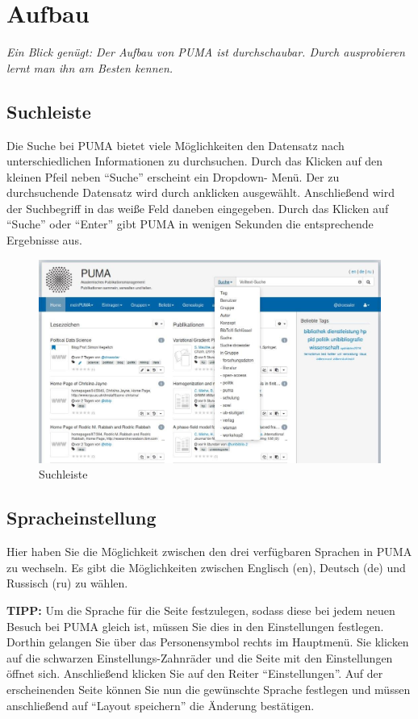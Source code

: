 \section{Aufbau}
\textit{Ein Blick genügt: Der Aufbau von PUMA ist durchschaubar. Durch ausprobieren lernt man ihn am Besten kennen.}
\subsection{Suchleiste}
Die Suche bei PUMA bietet viele Möglichkeiten den Datensatz nach unterschiedlichen Informationen zu durchsuchen. Durch das Klicken auf den kleinen Pfeil neben \enquote{Suche} erscheint ein Dropdown- Menü.  Der zu durchsuchende Datensatz wird durch anklicken ausgewählt. Anschließend wird der Suchbegriff in das weiße Feld daneben eingegeben. Durch das Klicken auf \enquote{Suche} oder \enquote{Enter} gibt PUMA in wenigen Sekunden die entsprechende Ergebnisse aus.

\begin{figure}[ht]
 \centering
 \includegraphics[scale=0.25]{puma-003}
 \caption{Suchleiste}
 \label{figure3}
\end{figure}  

\subsection{Spracheinstellung}
Hier haben Sie die Möglichkeit zwischen den drei verfügbaren Sprachen in PUMA zu wechseln. Es gibt die Möglichkeiten zwischen Englisch (en), Deutsch (de) und Russisch (ru) zu wählen.
\newline
\begin{shaded}
\centering
\textbf{TIPP:} Um die Sprache für die Seite festzulegen, sodass diese bei jedem neuen Besuch bei PUMA gleich ist, müssen Sie dies in den Einstellungen festlegen. Dorthin gelangen Sie über das Personensymbol rechts im Hauptmenü. Sie klicken auf die schwarzen Einstellungs-Zahnräder und die Seite mit den Einstellungen öffnet sich. Anschließend klicken Sie auf den Reiter \enquote{Einstellungen}. Auf der erscheinenden Seite können Sie nun die gewünschte Sprache festlegen und müssen anschließend auf \enquote{Layout speichern} die Änderung bestätigen.
\end{shaded}
